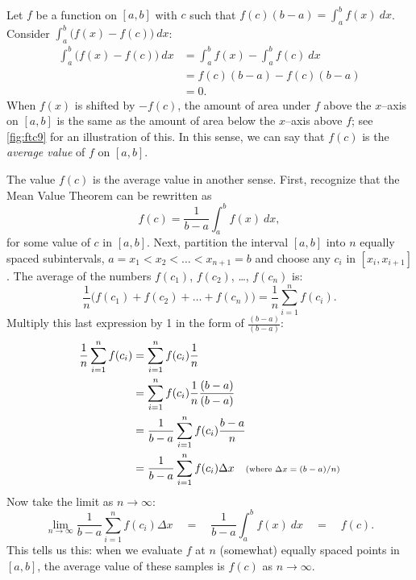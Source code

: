 {%
{\hfill {}}
} %
{%
{\\ \noindent {}}
}%

Let $f$ be a function on $[a,b]$ with $c$ such that $f(c)(b-a) = \int_a^bf(x)\ dx$. Consider $\int_a^b\big(f(x)-f(c)\big)\ dx$:
\begin{align*}
	\int_a^b\big(f(x)-f(c)\big)\ dx
	&= \int_a^b f(x) - \int_a^b f(c)\ dx\\
	&= f(c)(b-a) - f(c)(b-a) \\
	&= 0.
\end{align*}
When $f(x)$ is shifted by $-f(c)$, the amount of area under $f$ above the $x$--axis on $[a,b]$ is the same as the amount of area below the $x$--axis above $f$; see \autoref{fig:ftc9} for an illustration of this. In this sense, we can say that $f(c)$ is the \textit{average value} of $f$ on $[a,b]$. 

The value $f(c)$ is the average value in another sense. First, recognize that the Mean Value Theorem can be rewritten as
\[f(c) = \frac{1}{b-a}\int_a^b f(x)\ dx,\]
for some value of $c$ in $[a,b]$. Next, partition the interval $[a,b]$ into $n$ equally spaced subintervals, $a=x_1 < x_2 < \ldots < x_{n+1}=b$ and choose any $c_i$ in $[x_i,x_{i+1}]$. The average of the numbers $f(c_1)$, $f(c_2)$, \ldots, $f(c_n)$ is:
\[\frac1n\Big(f(c_1) + f(c_2) + \ldots + f(c_n)\Big) = \frac1n\sum_{i=1}^n f(c_i).\]
Multiply this last expression by 1 in the form of $\frac{(b-a)}{(b-a)}$:
\begin{align*}
	\frac1n\sum_{i=1}^n f(c_i)
	&= \sum_{i=1}^n f(c_i)\frac1n \\
	&= \sum_{i=1}^n f(c_i)\frac1n \frac{(b-a)}{(b-a)} \\
	&= \frac{1}{b-a} \sum_{i=1}^n f(c_i)\frac{b-a}n  \\
	&=\frac{1}{b-a} \sum_{i=1}^n f(c_i)\Delta x
	\quad \text{\scriptsize (where $\Delta x = (b-a)/n$)} %
\end{align*}
Now take the limit as $n\to\infty$:
\[
 \lim_{n\to\infty} \frac{1}{b-a} \sum_{i=1}^n f(c_i)\Delta x\quad
 = \quad \frac{1}{b-a} \int_a^b f(x)\ dx\quad = \quad  f(c).
\]
This tells us this: when we evaluate $f$ at $n$ (somewhat) equally spaced points in $[a,b]$, the average value of these samples is $f(c)$ as $n\to\infty$.

